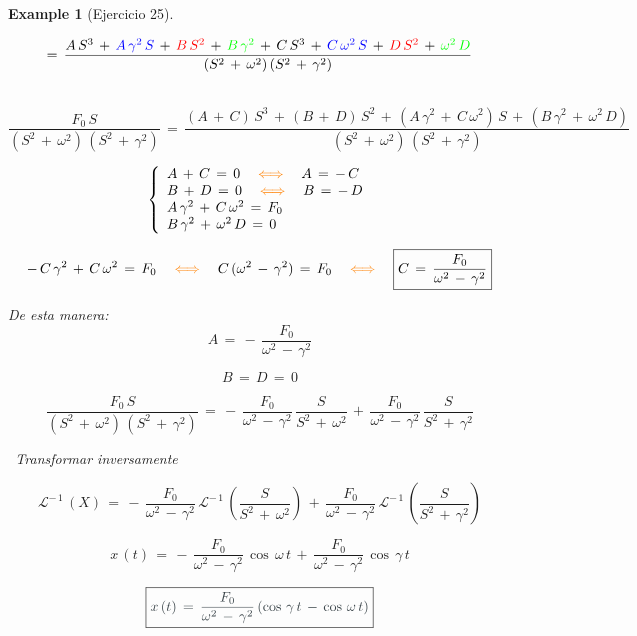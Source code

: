 \documentclass[a4paper,11pt,openany]{book}
\newtheorem{exmp}{Example}[section]
\begin{document}
\begin{exmp}[Ejercicio 25]
\begin{tcolorbox}[colback=orange!5!white,colframe=orange!75!black,fonttitle=\bfseries,title=\sf Aparte]
$$=\,\dfrac{A\,S^{3}\,+\,\textcolor{blue}{A\,\gamma^{2}\,S}\,+\,\textcolor{red}{B\,S^{2}}\,+\,\textcolor{green}{B\,\gamma^{2}}\,+\,C\,S^{3}\,+\,\textcolor{blue}{C\,\omega^{2}\,S}\,+\,\textcolor{red}{D\,S^{2}}\,+\,\textcolor{green}{\omega^{2}\,D} }{(S^{2}\,+\,\omega^{2})\,(S^{2}\,+\,\gamma^{2})}$$
 
\textcolor{orange}{}\, $$\dfrac{F_{0}\,S}{(S^{2}\,+\,\omega^{2})\,(S^{2}\,+\,\gamma^{2})}\,=\,\dfrac{(A\,+\,C)\,S^{3}\,+\,(B\,+\,D)\,S^{2}\,+\,(A\,\gamma^{2}\,+\,C\,\omega^{2})\,S\,+\,(B\,\gamma^{2}\,+\,\omega^{2}\,D) }{(S^{2}\,+\,\omega^{2})\,(S^{2}\,+\,\gamma^{2})}$$
 
$$\left\{
\begin{array}{ll}
A\,+\,C\,=\,0 \quad \textcolor{orange}{\iff} \quad A\,=\,-\,C \\
B\,+\,D\,=\,0 \quad \textcolor{orange}{\iff} \quad B\,=\,-\,D \\
A\,\gamma^{2}\,+\,C\,\omega^{2}\,=\,F_{0} \\
B\,\gamma^{2}\,+\,\omega^{2}\,D\,=\,0
\end{array}
\right.$$
 
$$-\,C\,\gamma^{2}\,+\,C\,\omega^{2}\,=\,F_{0} \quad \textcolor{orange}{\iff} \quad C\,(\omega^{2}\,-\,\gamma^{2} )\,=\,F_{0} \quad \textcolor{orange}{\iff} \quad \boxed{C\,=\,\dfrac{F_{0}}{\omega^{2}\,-\,\gamma^{2}} }$$
 
De esta manera: $$\boxed{A\,=\,-\,\dfrac{F_{0}}{\omega^{2}\,-\,\gamma^{2} } }$$
 
$$\boxed{B\,=\,D\,=\,0}$$
 
$$\dfrac{F_{0}\,S}{(S^{2}\,+\,\omega^{2})\,(S^{2}\,+\,\gamma^{2})}\,=\,-\,\dfrac{F_{0}}{\omega^{2}\,-\,\gamma^{2} }\,\dfrac{S }{S^{2}\,+\,\omega^{2}}\,+\,\dfrac{F_{0}}{\omega^{2}\,-\,\gamma^{2}}\,\dfrac{S}{S^{2}\,+\,\gamma^{2} }$$
 
\end{tcolorbox}
 
\textcolor{arsenic}{}\, Transformar inversamente
 
$$\mathcal{L}^{-\,1}\,\left(X \right)\,=\,-\,\dfrac{F_{0}}{\omega^{2}\,-\,\gamma^{2} }\,\mathcal{L}^{-\,1}\,\left(\dfrac{S }{S^{2}\,+\,\omega^{2}} \right)\,+\,\dfrac{F_{0}}{\omega^{2}\,-\,\gamma^{2}}\,\mathcal{L}^{-\,1}\,\left(\dfrac{S}{S^{2}\,+\,\gamma^{2} } \right)$$
 
$$x\,(t)\,=\,-\,\dfrac{F_{0}}{\omega^{2}\,-\,\gamma^{2} }\,\cos\,\omega\,t\,+\,\dfrac{F_{0}}{\omega^{2}\,-\,\gamma^{2}}\,\cos\,\gamma\,t$$
 
$$\boxed{\textcolor{arsenic}{x\,(t)\,=\,\dfrac{F_{0}}{\omega^{2}\,-\,\gamma^{2} }\,(\cos\,\gamma\,t\,-\,\cos\,\omega\,t) } } $$
 
\end{exmp}
\end{document}
